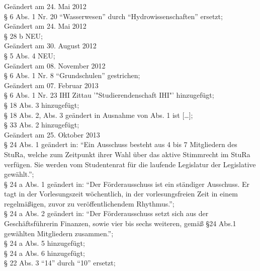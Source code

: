 Geändert am 24. Mai 2012\\
§ 6 Abs. 1 Nr. 20 "`Wasserwesen"' durch "`Hydrowissenschaften"' ersetzt; \\

Geändert am 24. Mai 2012\\
§ 28 b NEU; \\

Geändert am 30. August 2012\\
§ 5 Abs. 4 NEU; \\

Geändert am 08. November 2012\\
§ 6 Abs. 1 Nr. 8 "`Grundschulen"' gestrichen; \\

Geändert am 07. Februar 2013\\
§ 6 Abs. 1 Nr. 23 IHI Zittau '"Studierendenschaft IHI"' hinzugefügt; \\
§ 18 Abs. 3 hinzugefügt; \\
§ 18 Abs. 2, Abs. 3 geändert in Ausnahme von Abs. 1 ist [\ldots]; \\
§ 33 Abs. 2 hinzugefügt; \\

Geändert am 25. Oktober 2013 \\
§ 24 Abs. 1 geändert in: "`Ein Ausschuss besteht aus 4 bis 7 Mitgliedern des StuRa, welche zum Zeitpunkt ihrer Wahl über das aktive Stimmrecht im StuRa verfügen. Sie werden vom Studentenrat für die laufende Legislatur der Legislative gewählt."'; \\
§ 24 a Abs. 1 geändert in: "`Der Förderausschuss ist ein ständiger Ausschuss. Er tagt in der Vorlesungszeit wöchentlich, in der vorlesungsfreien Zeit in einem regelmäßigen, zuvor zu veröffentlichendem Rhythmus."'; \\
§ 24 a Abs. 2 geändert in: "`Der Förderausschuss setzt sich aus der Geschäftsführerin Finanzen, sowie vier bis sechs weiteren, gemäß §24 Abs.1 gewählten Mitgliedern zusammen."'; \\
§ 24 a Abs. 5 hinzugefügt; \\
§ 24 a Abs. 6 hinzugefügt; \\
§ 22 Abs. 3 "`14"' durch "`10"' ersetzt; \\

\normalsize
